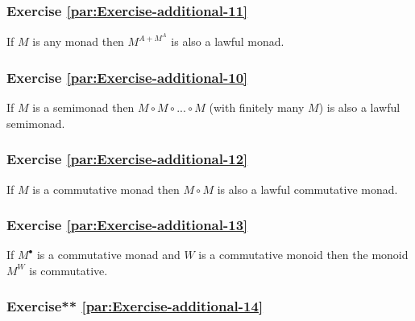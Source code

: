 \subsubsection{Exercise \label{par:Exercise-additional-11}\ref{par:Exercise-additional-11}}

If $M$ is any monad then $M^{A+M^{A}}$ is also a lawful monad.

\subsubsection{Exercise \label{par:Exercise-additional-10}\ref{par:Exercise-additional-10}}

If $M$ is a semimonad then $M\circ M\circ...\circ M$ (with finitely
many $M$) is also a lawful semimonad.

\subsubsection{Exercise \label{par:Exercise-additional-12}\ref{par:Exercise-additional-12}}

If $M$ is a commutative monad then $M\circ M$ is also a lawful commutative
monad.

\subsubsection{Exercise \label{par:Exercise-additional-13}\ref{par:Exercise-additional-13}}

If $M^{\bullet}$ is a commutative monad and $W$ is a commutative
monoid then the monoid $M^{W}$ is commutative.

\subsubsection{Exercise{*}{*} \label{par:Exercise-additional-14}\ref{par:Exercise-additional-14}}

